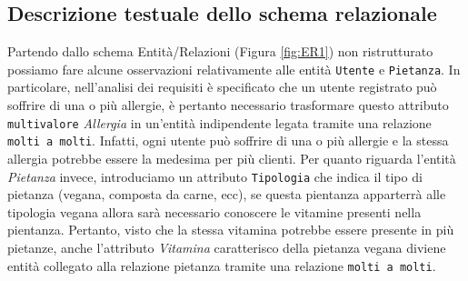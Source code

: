 \documentclass[10pt]{article}
\begin{document}
		\subsection{Descrizione testuale dello schema relazionale}
		Partendo dallo schema Entità/Relazioni (Figura \ref{fig:ER1}) non ristrutturato possiamo fare alcune osservazioni relativamente alle entità \texttt{Utente} e \texttt{Pietanza}. In particolare, nell'analisi dei requisiti \`e specificato che un utente registrato pu\`o soffrire di una o pi\`u allergie, \`e pertanto necessario trasformare questo attributo \texttt{multivalore} \textit{Allergia} in un'entit\`a indipendente legata tramite una relazione \texttt{molti a molti}. Infatti, ogni utente pu\`o soffrire di una o pi\`u allergie e la stessa allergia potrebbe essere la medesima per pi\`u clienti. Per quanto riguarda l'entit\`a \textit{Pietanza} invece, introduciamo un attributo \texttt{Tipologia} che indica il tipo di pietanza (vegana, composta da carne, ecc), se questa pientanza apparterrà alle tipologia vegana allora sarà necessario conoscere le vitamine presenti nella pientanza. Pertanto, visto che la stessa vitamina potrebbe essere presente in più pietanze, anche l'attributo \textit{Vitamina} caratterisco della pietanza vegana diviene entità collegato alla relazione pietanza tramite una relazione \texttt{molti a molti}.  
\end{document}
